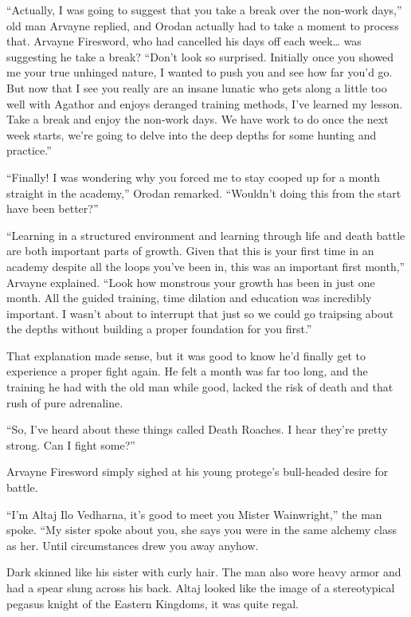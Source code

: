 \documentclass[a4paper,10pt]{book}
\begin{document}
“Actually, I was going to suggest that you take a break over the non-work days,” old man Arvayne replied, and Orodan actually had to take a moment to process that. Arvayne Firesword, who had cancelled his days off each week… was suggesting he take a break? “Don’t look so surprised. Initially once you showed me your true unhinged nature, I wanted to push you and see how far you’d go. But now that I see you really are an insane lunatic who gets along a little too well with Agathor and enjoys deranged training methods, I’ve learned my lesson. Take a break and enjoy the non-work days. We have work to do once the next week starts, we’re going to delve into the deep depths for some hunting and practice.”\par
“Finally! I was wondering why you forced me to stay cooped up for a month straight in the academy,” Orodan remarked. “Wouldn’t doing this from the start have been better?”\par
“Learning in a structured environment and learning through life and death battle are both important parts of growth. Given that this is your first time in an academy despite all the loops you’ve been in, this was an important first month,” Arvayne explained. “Look how monstrous your growth has been in just one month. All the guided training, time dilation and education was incredibly important. I wasn’t about to interrupt that just so we could go traipsing about the depths without building a proper foundation for you first.”\par
That explanation made sense, but it was good to know he’d finally get to experience a proper fight again. He felt a month was far too long, and the training he had with the old man while good, lacked the risk of death and that rush of pure adrenaline.\par
“So, I’ve heard about these things called Death Roaches. I hear they’re pretty strong. Can I fight some?”\par
Arvayne Firesword simply sighed at his young protege’s bull-headed desire for battle.\par
\par
“I’m Altaj Ilo Vedharna, it’s good to meet you Mister Wainwright,” the man spoke. “My sister spoke about you, she says you were in the same alchemy class as her. Until circumstances drew you away anyhow.\par
Dark skinned like his sister with curly hair. The man also wore heavy armor and had a spear slung across his back. Altaj looked like the image of a stereotypical pegasus knight of the Eastern Kingdoms, it was quite regal.\par
\end{document}
